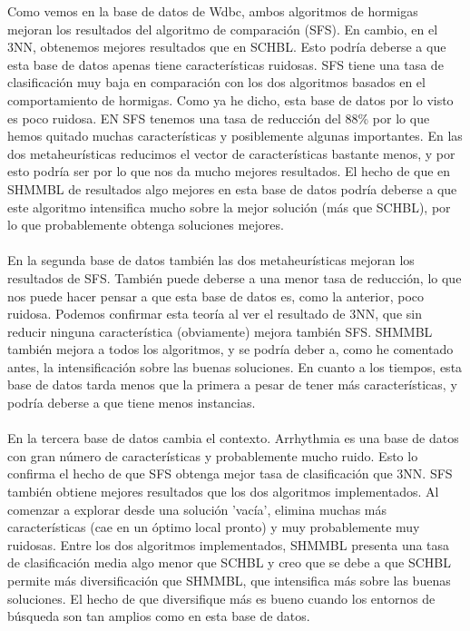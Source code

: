 Como vemos en la base de datos de Wdbc, ambos algoritmos de hormigas mejoran los resultados del algoritmo de comparación (SFS). En cambio, en el 3NN, obtenemos mejores resultados que en SCHBL. Esto podría deberse a que esta base de datos apenas tiene características ruidosas. SFS tiene una tasa de clasificación muy baja en comparación con los dos algoritmos basados en el comportamiento de hormigas. Como ya he dicho, esta base de datos por lo visto es poco ruidosa. EN SFS tenemos una tasa de reducción del 88\% por lo que hemos quitado muchas características y posiblemente algunas importantes. En las dos metaheurísticas reducimos el vector de características bastante menos, y por esto podría ser por lo que nos da mucho mejores resultados. El hecho de que en SHMMBL de resultados algo mejores en esta base de datos podría deberse a que este algoritmo intensifica mucho sobre la mejor solución (más que SCHBL), por lo que probablemente obtenga soluciones mejores.
\\
\\
En la segunda base de datos también las dos metaheurísticas mejoran los resultados de SFS. También puede deberse a una menor tasa de reducción, lo que nos puede hacer pensar a que esta base de datos es, como la anterior, poco ruidosa. Podemos confirmar esta teoría al ver el resultado de 3NN, que sin reducir ninguna característica (obviamente) mejora también SFS. SHMMBL también mejora a todos los algoritmos, y se podría deber a, como he comentado antes, la intensificación sobre las buenas soluciones. En cuanto a los tiempos, esta base de datos tarda menos que la primera a pesar de tener más características, y podría deberse a que tiene menos instancias.
\\
\\
En la tercera base de datos cambia el contexto. Arrhythmia es una base de datos con gran número de características y probablemente mucho ruido. Esto lo confirma el hecho de que SFS obtenga mejor tasa de clasificación que 3NN. SFS también obtiene mejores resultados que los dos algoritmos implementados. Al comenzar a explorar desde una solución 'vacía', elimina muchas más características (cae en un óptimo local pronto) y muy probablemente muy ruidosas. Entre los dos algoritmos implementados, SHMMBL presenta una tasa de clasificación media algo menor que SCHBL y creo que se debe a que SCHBL permite más diversificación que SHMMBL, que intensifica más sobre las buenas soluciones. El hecho de que diversifique más es bueno cuando los entornos de búsqueda son tan amplios como en esta base de datos.

